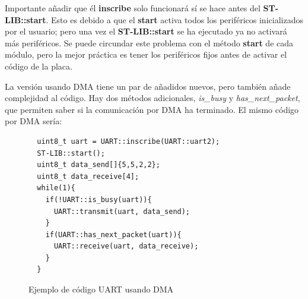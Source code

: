 \documentclass{report}
\begin{document}
\par
Importante añadir que él \textbf{inscribe} solo funcionará sí se hace antes del \textbf{ST-LIB::start}. Esto es debido a que el \textbf{start} activa todos los periféricos inicializados por el usuario; pero una vez el \textbf{ST-LIB::start} se ha ejecutado ya no activará más periféricos. Se puede circundar este problema con el método \textbf{start} de cada módulo, pero la mejor práctica es tener los periféricos fijos antes de activar el código de la placa. 
\par \vspace{0.3cm}
La versión usando DMA tiene un par de añadidos nuevos, pero también añade complejidad al código. Hay dos métodos adicionales, \textit{is\_busy} y \textit{has\_next\_packet}, que permiten saber si la comunicación por DMA ha terminado. El mismo código por DMA sería: 
\begin{figure}[h]
\begin{lstlisting}
  uint8_t uart = UART::inscribe(UART::uart2);
  ST-LIB::start();
  uint8_t data_send[]{5,5,2,2};
  uint8_t data_receive[4];
  while(1){
    if(!UART::is_busy(uart)){
      UART::transmit(uart, data_send);
    }
    if(UART::has_next_packet(uart)){
      UART::receive(uart, data_receive);
    }
  }
\end{lstlisting}
\caption{Ejemplo de código UART usando DMA}
  \label{UARTwDMAcode}
\end{figure}
\par \vspace{0.3cm}
\end{document}
